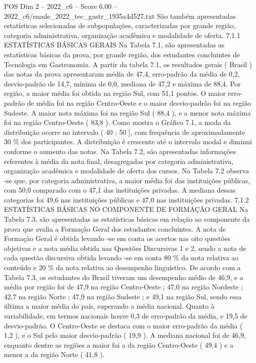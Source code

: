 \begin{textsample}{POS Dim 2 – 2022\_c6 – Score 6.00 – 2022\_c6/enade\_2022\_tec\_gastr\_1935a4d527.txt}
São também apresentadas estatísticas selecionadas de subpopulações, caracterizadas por grande região, categoria administrativa, organização acadêmica e modalidade de oferta. 7.1.1 ESTATÍSTICAS BÁSICAS GERAIS Na Tabela 7.1, são apresentadas as estatísticas básicas da prova, por grande região, dos estudantes concluintes de Tecnologia em Gastronomia.
A partir da tabela 7.1, os resultados gerais ( Brasil ) das notas da prova apresentaram média de 47,4, erro-padrão da média de 0,2, desvio-padrão de 14,7, mínima de 0,0, mediana de 47,2 e máxima de 88,4.
Por região, a maior média foi obtida na região Sul, com 51,1 pontos.
O maior erro-padrão de média foi na região Centro-Oeste e o maior desvio-padrão foi na região Sudeste.
A maior nota máxima foi na região Sul ( 88,4 ), e a menor nota máxima foi na região Centro-Oeste ( 83,8 ).
Como mostra o Gráfico 7.1, a moda da distribuição ocorre no intervalo ( 40 ; 50 ], com frequência de aproximadamente 30 \% dos participantes.
A distribuição é crescente até o intervalo modal e diminui conforme o aumento das notas.
Na Tabela 7.2, são apresentadas informações referentes à média da nota final, desagregadas por categoria administrativa, organização acadêmica e modalidade de oferta dos cursos.
Na Tabela 7.2 observa -se que, por categoria administrativa, a maior média foi das instituições públicas, com 50,0 comparado com o 47,1 das instituições privadas.
A mediana dessas categorias foi 49,6 nas instituições públicas e 47,0 nas instituições privadas. 7.1.2 ESTATÍSTICAS BÁSICAS NO COMPONENTE DE FORMAÇÃO GERAL Na Tabela 7.3, são apresentadas as estatísticas básicas em relação ao componente da prova que avalia a Formação Geral dos estudantes concluintes.
A nota de Formação Geral é obtida levando -se em conta os acertos nas oito questões objetivas e a nota média obtida nas Questões Discursivas 1 e 2, sendo a nota de cada questão discursiva obtida levando -se em conta 80 \% da nota relativa ao conteúdo e 20 \% da nota relativa ao desempenho linguístico.
De acordo com a Tabela 7.3, os estudantes do Brasil tiveram um desempenho médio de 46,9, e a média por região foi de 47,9 na região Centro-Oeste ; 47,0 na região Nordeste ; 42,7 na região Norte ; 47,9 na região Sudeste ; e 49,1 na região Sul, sendo essa última a maior média do país, superando a média nacional.
Quanto à variabilidade, em termos nacionais houve 0,3 de erro-padrão da média, e 19,5 de desvio-padrão.
O Centro-Oeste se destaca com o maior erro-padrão da média ( 1,2 ), e o Sul pelo maior desvio-padrão ( 19,9 ).
A mediana nacional foi de 46,9, enquanto dentre as regiões a maior foi a da região Centro-Oeste ( 49,4 ) e a menor a da região Norte ( 41,8 ).

\end{textsample}
